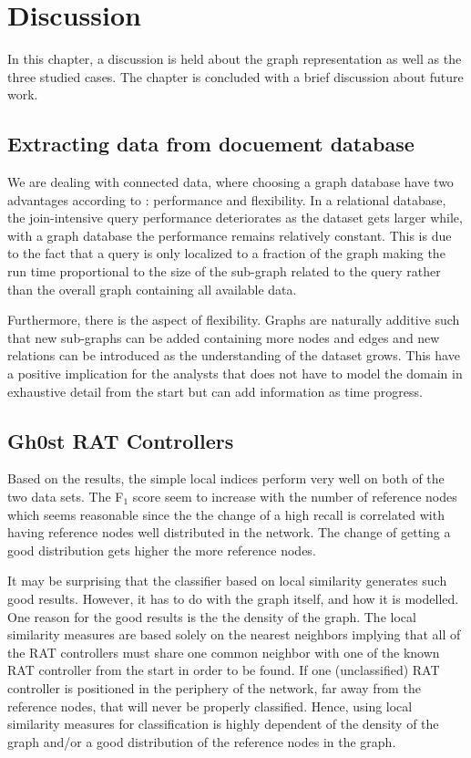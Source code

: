 \chapter{Discussion}
In this chapter, a discussion is held about the graph representation as well as the three studied cases. The chapter is concluded with a brief discussion about future work.

\section{Extracting data from docuement database}
We are dealing with connected data, where choosing a graph database have two advantages according to \citet{robinson2013}: performance and flexibility. In a relational database, the join-intensive query performance deteriorates as the dataset gets larger while, with a graph database the performance remains relatively constant. This is due to the fact that a query is only localized to a fraction of the graph making the run time proportional to the size of the sub-graph related to the query rather than the overall graph containing all available data.

Furthermore, there is the aspect of flexibility. Graphs are naturally additive \cite{robinson2013} such that new sub-graphs can be added containing more nodes and edges and new relations can be introduced as the understanding of the dataset grows. This have a positive implication for the analysts that does not have to model the domain in exhaustive detail from the start but can add information as time progress.


\section{Gh0st RAT Controllers}
Based on the results, the simple local indices perform very well on both of the two data sets. The F$_1$ score seem to increase with the number of reference nodes which seems reasonable since the the change of a high recall is correlated with having reference nodes well distributed in the network. The change of getting a good distribution gets higher the more reference nodes. 

It may be surprising that the classifier based on local similarity generates such good results. However, it has to do with the graph itself, and how it is modelled. One reason for the good results is the the density of the graph. The local similarity measures are based solely on the nearest neighbors implying that all of the RAT controllers must share one common neighbor with one of the known RAT controller from the start in order to be found. If one (unclassified) RAT controller is positioned in the periphery of the network, far away from the reference nodes, that will never be properly classified. Hence, using local similarity measures for classification is highly dependent of the density of the graph and/or a good distribution of the reference nodes in the graph. 

